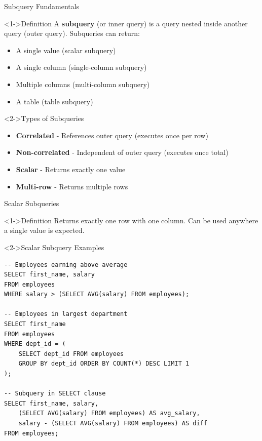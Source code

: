 \documentclass[aspectratio=169,11pt]{beamer}
\begin{document}
\begin{frame}{Subquery Fundamentals}
\begin{block}<1->{Definition}
A \textbf{subquery} (or inner query) is a query nested inside another query (outer query). Subqueries can return:
\begin{itemize}
    \item A single value (scalar subquery)
    \item A single column (single-column subquery)
    \item Multiple columns (multi-column subquery)
    \item A table (table subquery)
\end{itemize}
\end{block}

\pause
\begin{block}<2->{Types of Subqueries}
\begin{itemize}
    \item \textbf{Correlated} - References outer query (executes once per row)
    \item \textbf{Non-correlated} - Independent of outer query (executes once total)
    \item \textbf{Scalar} - Returns exactly one value
    \item \textbf{Multi-row} - Returns multiple rows
\end{itemize}
\end{block}
\end{frame}

\begin{frame}[fragile]{Scalar Subqueries}
\begin{block}<1->{Definition}
Returns exactly one row with one column. Can be used anywhere a single value is expected.
\end{block}

\pause
\begin{exampleblock}<2->{Scalar Subquery Examples}
\begin{lstlisting}
-- Employees earning above average
SELECT first_name, salary
FROM employees
WHERE salary > (SELECT AVG(salary) FROM employees);

-- Employees in largest department
SELECT first_name
FROM employees
WHERE dept_id = (
    SELECT dept_id FROM employees 
    GROUP BY dept_id ORDER BY COUNT(*) DESC LIMIT 1
);

-- Subquery in SELECT clause
SELECT first_name, salary,
    (SELECT AVG(salary) FROM employees) AS avg_salary,
    salary - (SELECT AVG(salary) FROM employees) AS diff
FROM employees;
\end{lstlisting}
\end{exampleblock}
\end{frame}
\end{document}
